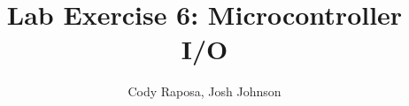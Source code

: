 \documentclass{article}
\title{Lab Exercise 6: Microcontroller I/O}
\author{Cody Raposa, Josh Johnson}
\affil{ELEC2850 Microcontrollers Using C Programming}
\begin{document}
\maketitle
\begin{flushleft}

\end{flushleft}
\end{document}
